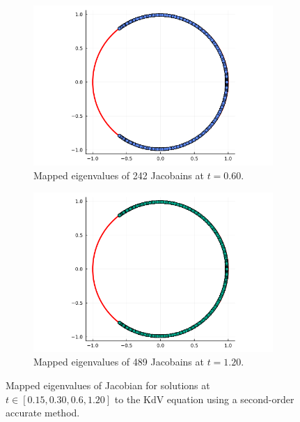 \documentclass[12pt]{report}
\begin{document}
\begin{solution}
\begin{enumerate}
\begin{figure}[H]
            \begin{subfigure}[b]{0.45\linewidth}
                \centering
                \includegraphics[width=\linewidth]{images/2b-1.png}
                \caption{Mapped eigenvalues of 242 Jacobains at $t=0.60$.}
                \label{fig2evals:c}
                \vspace{4ex}
            \end{subfigure}%
            \begin{subfigure}[b]{0.45\linewidth}
                \centering
                \includegraphics[width=\linewidth]{images/2b-2.png}
                \caption{Mapped eigenvalues of 489 Jacobains at $t=1.20$.}
                \label{fig2evals:d}
                \vspace{4ex}
            \end{subfigure}
            \caption{Mapped eigenvalues of Jacobian for solutions at $t\in[0.15,0.30,0.6,1.20]$ to the KdV equation using a second-order accurate method.}
            \label{fig2evals}
        \end{figure}


    \end{enumerate}
    


\end{solution}
\end{document}
